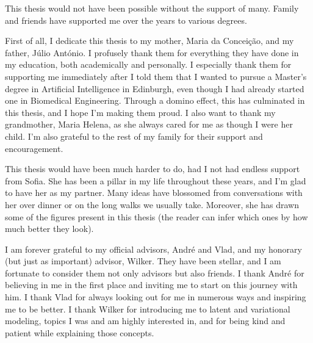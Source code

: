 \begin{acknowledgments}

    This thesis would not have been possible without the support of
    many. Family and friends have supported me over
    the years to various degrees.
    
    First of all, I dedicate this thesis to my mother, Maria da
    Conceição, and my father, Júlio António. I profusely thank them
    for everything they have done in my education, both academically
    and personally. I especially thank them for supporting me
    immediately after I told them that I wanted to pursue a Master's
    degree in Artificial Intelligence in Edinburgh, even though I had
    already started one in Biomedical Engineering. Through a domino
    effect, this has culminated in this thesis, and I hope I'm making
    them proud. I also want to thank my grandmother, Maria Helena, as she
    always cared for me as though I were her child. I'm also grateful
    to the rest of my family for their support and encouragement.
    
    This thesis would have been much harder to do, had I not had
    endless support from Sofia. She has been a pillar in my life
    throughout these years, and I'm glad to have her as my partner.
    Many ideas have blossomed from conversations with her over dinner
    or on the long walks we usually take. Moreover, she has drawn
    some of the figures present in this thesis (the reader can infer
    which ones by how much better they look).
    
    I am forever grateful to my official advisors, André and Vlad,
    and my honorary (but just as important) advisor, Wilker. They
    have been stellar, and I am fortunate to consider them not only
    advisors but also friends. I thank André for believing in me in
    the first place and inviting me to start on this journey with
    him. I thank Vlad for always looking out for me in numerous ways
    and inspiring me to be better. I thank Wilker for introducing me
    to latent and variational modeling, topics I was and am highly
    interested in, and for being kind and patient while explaining
    those concepts.
    

\end{acknowledgments}
